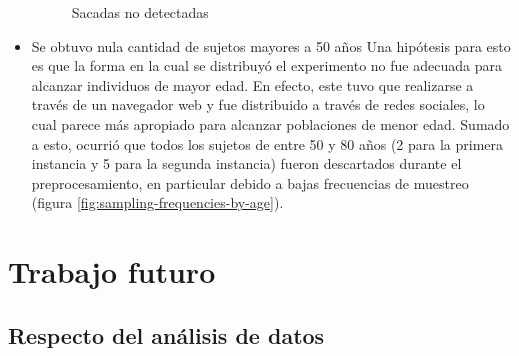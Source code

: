 \begin{itemize}
\begin{figure}
        \caption{Sacadas no detectadas}
        \label{fig:undetected-saccades-examples}
      \end{figure}

    \item
      Se obtuvo nula cantidad de sujetos mayores a 50 años
      Una hipótesis para esto es que la forma en la cual se distribuyó el
      experimento no fue adecuada para alcanzar individuos de mayor edad.
      En efecto, este tuvo que realizarse a través de un navegador web y fue
      distribuido a través de redes sociales, lo cual parece más apropiado para
      alcanzar poblaciones de menor edad.
      Sumado a esto, ocurrió que todos los sujetos de entre 50 y 80 años (2
      para la primera instancia y 5 para la segunda instancia) fueron
      descartados durante el preprocesamiento, en particular debido a bajas
      frecuencias de muestreo (figura \ref{fig:sampling-frequencies-by-age}).

  \end{itemize}

\section{Trabajo futuro}

\subsection{Respecto del análisis de datos}

